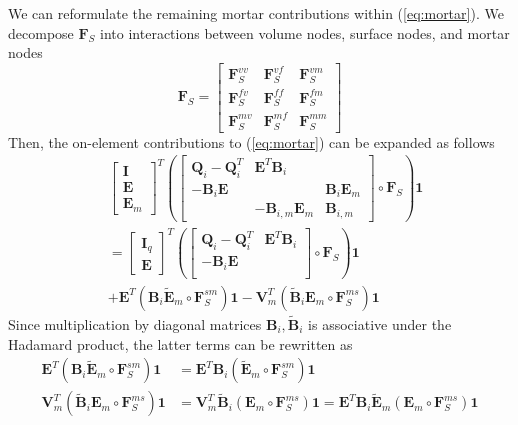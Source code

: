 \documentclass{svjour3}                     %
\renewcommand{\tilde}{\widetilde}
\newcommand{\LRp}[1]{\left( #1 \right)}
\begin{document}
We can reformulate the remaining mortar contributions within (\ref{eq:mortar}).  We decompose $\bm{F}_S$ into interactions between volume nodes, surface nodes, and mortar nodes
\[
\bm{F}_S = \begin{bmatrix}
\bm{F}_S^{vv} & \bm{F}_S^{vf} & \bm{F}_S^{vm}\\
\bm{F}_S^{fv} & \bm{F}_S^{ff} & \bm{F}_S^{fm}\\
\bm{F}_S^{mv} & \bm{F}_S^{mf} & \bm{F}_S^{mm}
\end{bmatrix}
\]
Then, the on-element contributions to (\ref{eq:mortar}) can be expanded as follows
\begin{align*}
&\begin{bmatrix} \bm{I} \\ \bm{E} \\ \bm{E}_m \end{bmatrix}^T
\LRp{\begin{bmatrix}
\bm{Q}_i-\bm{Q}_i^T & \bm{E}^T\bm{B}_i &\\
-\bm{B}_i\bm{E} &  & \bm{B}_{i}{\bm{E}}_m \\
& -\bm{B}_{i,m}{\bm{E}}_m & {\bm{B}}_{i,m}
\end{bmatrix} \circ \bm{F}_S}\bm{1} \\
&= 
\begin{bmatrix} \bm{I}_q \\ \bm{E} \end{bmatrix}^T
\LRp{\begin{bmatrix}
\bm{Q}_i-\bm{Q}_i^T & \bm{E}^T\bm{B}_i\\
-\bm{B}_i\bm{E} & \\
\end{bmatrix} \circ \bm{F}_S}\bm{1} \\
&+ \bm{E}^T \LRp{\bm{B}_i\tilde{\bm{E}}_m\circ \bm{F}_S^{sm}}\bm{1} - \bm{V}_m^T \LRp{ \tilde{\bm{B}}_i\bm{E}_m \circ \bm{F}_S^{ms}}\bm{1}
\end{align*}
Since multiplication by diagonal matrices $\bm{B}_i, \tilde{\bm{B}}_i$ is associative under the Hadamard product, the latter terms can be rewritten as 
\begin{align*}
 \bm{E}^T \LRp{\bm{B}_i\tilde{\bm{E}}_m\circ \bm{F}_S^{sm}}\bm{1} &=  \bm{E}^T \bm{B}_i \LRp{\tilde{\bm{E}}_m\circ \bm{F}_S^{sm}}\bm{1}\\
\bm{V}_m^T \LRp{ \tilde{\bm{B}}_i\bm{E}_m \circ \bm{F}_S^{ms}}\bm{1} &= \bm{V}_m^T \tilde{\bm{B}}_i \LRp{ \bm{E}_m \circ \bm{F}_S^{ms}}\bm{1} = \bm{E}^T \bm{B}_i \tilde{\bm{E}}_m \LRp{ \bm{E}_m \circ \bm{F}_S^{ms}}\bm{1} 
\end{align*}
\end{document}
